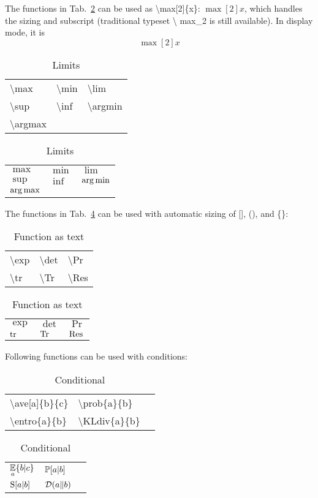 \documentclass{article}
\def\tbs{\textbackslash}
\begin{document}
The functions in Tab.~\ref{tab:limit} can be used as \tbs max[2]\{x\}:
$\max[2]{x}$, which handles the sizing and subscript (traditional typeset \tbs
max\_2 is still available).
In display mode, it is
$$\max[2]{x}$$
\begin{table}[htp]
    \caption{Limits}\label{tab:limit}
\centering
\begin{tabular}{lll}
\tbs max & \tbs min & \tbs lim \\
\tbs sup & \tbs inf & \tbs argmin \\
\tbs argmax
\end{tabular}
\begin{tabular}{|lll}
$\max$ & $\min$ & $\lim$ \\
$\sup$ & $\inf$ & $\argmin$ \\
$\argmax$
\end{tabular}
\end{table}

\pagebreak
The functions in Tab.~\ref{tab:ftext} can be used with automatic sizing of [],
(), and \{\}:
\begin{table}[htp]
    \caption{Function as text}\label{tab:ftext}
\centering
\begin{tabular}{lll}
\tbs exp    & \tbs det  & \tbs Pr \\
\tbs tr     & \tbs Tr   & \tbs Res\\
\end{tabular}
\begin{tabular}{|lll}
$\exp$      & $\det $   & $\Pr$     \\
$\tr$       & $\Tr$     & $\Res$    \\
\end{tabular}
\end{table}

Following functions can be used with conditions:
\begin{table}[htp]
    \caption{Conditional}\label{tab:cond}
\centering
\begin{tabular}{lll}
\tbs ave[a]\{b\}\{c\} & \tbs prob\{a\}\{b\} \\
\tbs entro\{a\}\{b\}  & \tbs KLdiv\{a\}\{b\}\\
\end{tabular}
\begin{tabular}{|lll}
$\displaystyle\ave[a]{b}{c}$  & $\prob{a}{b} $ \\
$\entro{a}{b} $               & $\KLdiv{a}{b} $\\
\end{tabular}
\end{table}
\end{document}
